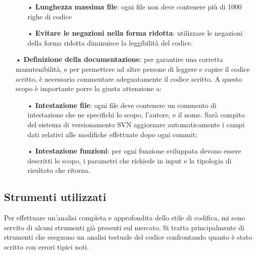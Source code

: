 \begin{itemize}
\begin{itemize}
\item[•] \textbf{Lunghezza massima file}: ogni file non deve contenere più di 1000 righe di codice

\item[•] \textbf{Evitare le negazioni nella forma ridotta}: utilizzare le negazioni della forma ridotta diminuisce la leggibilità del codice.
\end{itemize}

\item[•] \textbf{Definizione della documentazione}: per garantire una corretta manutenibilità, e per permettere ad altre persone di leggere e capire il codice scritto, è necessario commentare adeguatamente il codice scritto. A questo scopo è importante porre la giusta attenzione a:

\begin{itemize}
\item[•] \textbf{Intestazione file}: ogni file deve contenere un commento di intestazione che ne specifichi lo scopo, l'autore, e il nome. Sarà compito del sistema di versionamento SVN aggiornare automaticamente i campi dati relativi alle modifiche effettuate dopo ogni commit;

\item[•] \textbf{Intestazione funzioni}: per ogni funzione sviluppata devono essere descritti lo scopo, i parametri che richiede in input e la tipologia di risultato che ritorna. 
\end{itemize}
\end{itemize}

\subsection{Strumenti utilizzati}
Per effettuare un'analisi completa e approfondita dello stile di codifica, mi sono servito di alcuni strumenti  già presenti sul mercato. Si tratta principalmente di strumenti che eseguono un analisi testuale del codice confrontando quanto è stato scritto con errori tipici noti.

